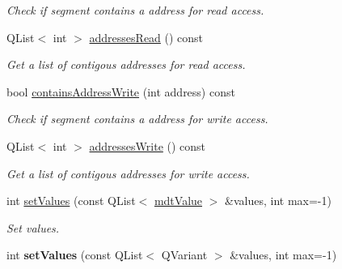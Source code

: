 \begin{DoxyCompactItemize}
\begin{DoxyCompactList}\small\item\em Check if segment contains a address for read access. \end{DoxyCompactList}\item 
\hypertarget{classmdt_device_ios_segment_a6fceed16afdb918856792ede4e839d24}{
QList$<$ int $>$ \hyperlink{classmdt_device_ios_segment_a6fceed16afdb918856792ede4e839d24}{addressesRead} () const }
\label{classmdt_device_ios_segment_a6fceed16afdb918856792ede4e839d24}

\begin{DoxyCompactList}\small\item\em Get a list of contigous addresses for read access. \end{DoxyCompactList}\item 
\hypertarget{classmdt_device_ios_segment_a67b3a56f03a7dd8b6713a17908f88230}{
bool \hyperlink{classmdt_device_ios_segment_a67b3a56f03a7dd8b6713a17908f88230}{containsAddressWrite} (int address) const }
\label{classmdt_device_ios_segment_a67b3a56f03a7dd8b6713a17908f88230}

\begin{DoxyCompactList}\small\item\em Check if segment contains a address for write access. \end{DoxyCompactList}\item 
\hypertarget{classmdt_device_ios_segment_a87429d142a5de4831623e04e6f8dabf9}{
QList$<$ int $>$ \hyperlink{classmdt_device_ios_segment_a87429d142a5de4831623e04e6f8dabf9}{addressesWrite} () const }
\label{classmdt_device_ios_segment_a87429d142a5de4831623e04e6f8dabf9}

\begin{DoxyCompactList}\small\item\em Get a list of contigous addresses for write access. \end{DoxyCompactList}\item 
int \hyperlink{classmdt_device_ios_segment_a369b37d7b9db7d56e15765a44706e4d3}{setValues} (const QList$<$ \hyperlink{classmdt_value}{mdtValue} $>$ \&values, int max=-\/1)
\begin{DoxyCompactList}\small\item\em Set values. \end{DoxyCompactList}\item 
\hypertarget{classmdt_device_ios_segment_a9eba9ce97404ea4fbcf89339a2e03502}{
int {\bfseries setValues} (const QList$<$ QVariant $>$ \&values, int max=-\/1)}
\label{classmdt_device_ios_segment_a9eba9ce97404ea4fbcf89339a2e03502}


\end{DoxyCompactItemize}
